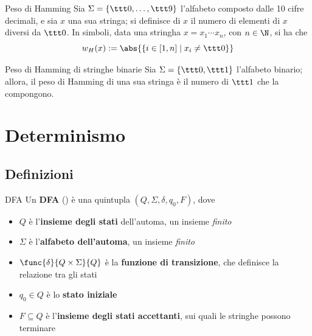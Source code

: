 \documentclass[a4paper, 12pt]{report}
\begin{document}
    \begin{frameddefn}{Peso di Hamming}
        Sia $\Sigma = \{\ttt 0, \ldots,  \ttt 9\}$ l'alfabeto composto dalle 10 cifre decimali, e sia $x$ una sua stringa; si definisce  di $x$ il numero di elementi di $x$ diversi da $\ttt 0$. In simboli, data una stringha $x = x_1 \cdots x_n$, con $n \in \N$, si ha che $$w_H(x) := \abs{\{i \in [1, n] \mid x_i \neq \ttt 0\}}$$
    \end{frameddefn}

    \begin{framedobs}{Peso di Hamming di stringhe binarie}
        Sia $\Sigma = \{ \ttt 0, \ttt 1 \}$ l'alfabeto binario; allora, il peso di Hamming di una sua stringa è il numero di $\ttt 1$ che la compongono.
    \end{framedobs}

    \section{Determinismo}

    \subsection{Definizioni}

    \begin{frameddefn}{DFA}
        Un \textbf{DFA} () è una quintupla $(Q, \Sigma, \delta, q_0, F)$, dove

        \begin{itemize}
            \item $Q$ è l'\textbf{insieme degli stati} dell'automa, un insieme \textit{finito}
            \item $\Sigma$ è l'\textbf{alfabeto dell'automa}, un insieme \textit{finito}
            \item $\func{\delta}{Q \times \Sigma}{Q}$ è la \textbf{funzione di transizione}, che definisce la relazione tra gli stati
            \item $q_0 \in Q$ è lo \textbf{stato iniziale}
            \item $F \subseteq Q$ è l'\textbf{insieme degli stati accettanti}, sui quali le stringhe possono terminare
        \end{itemize}

    \end{frameddefn}
\end{document}
